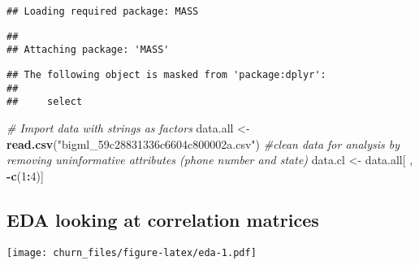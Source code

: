 \documentclass[]{article}
\newenvironment{Shaded}{\begin{snugshade}}{\end{snugshade}}
\newcommand{\KeywordTok}[1]{\textcolor[rgb]{0.13,0.29,0.53}{\textbf{#1}}}
\newcommand{\DataTypeTok}[1]{\textcolor[rgb]{0.13,0.29,0.53}{#1}}
\newcommand{\DecValTok}[1]{\textcolor[rgb]{0.00,0.00,0.81}{#1}}
\newcommand{\StringTok}[1]{\textcolor[rgb]{0.31,0.60,0.02}{#1}}
\newcommand{\CommentTok}[1]{\textcolor[rgb]{0.56,0.35,0.01}{\textit{#1}}}
\newcommand{\OperatorTok}[1]{\textcolor[rgb]{0.81,0.36,0.00}{\textbf{#1}}}
\newcommand{\NormalTok}[1]{#1}
\begin{document}
\begin{verbatim}
## Loading required package: MASS
\end{verbatim}

\begin{verbatim}
## 
## Attaching package: 'MASS'
\end{verbatim}

\begin{verbatim}
## The following object is masked from 'package:dplyr':
## 
##     select
\end{verbatim}

\begin{Shaded}
\begin{Highlighting}[]
\CommentTok{# Import data with strings as factors}
\NormalTok{data.all <-}\StringTok{ }\KeywordTok{read.csv}\NormalTok{(}\StringTok{"bigml_59c28831336c6604c800002a.csv"}\NormalTok{)}
\CommentTok{#clean data for analysis by removing uninformative attributes (phone number and state)}
\NormalTok{data.cl <-}\StringTok{ }\NormalTok{data.all[ , }\OperatorTok{-}\KeywordTok{c}\NormalTok{(}\DecValTok{1}\OperatorTok{:}\DecValTok{4}\NormalTok{)]}
\end{Highlighting}
\end{Shaded}

\subsection{EDA looking at correlation
matrices}\label{eda-looking-at-correlation-matrices}

\begin{Shaded}
\end{Shaded}

\texttt{[image: churn\_files/figure-latex/eda-1.pdf]}

\begin{Shaded}
\end{Shaded}
\end{document}
